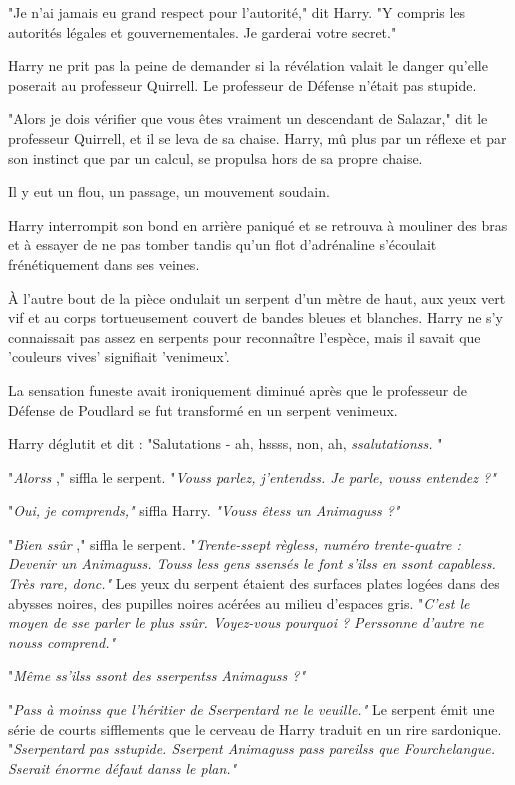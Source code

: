 "Je n'ai jamais eu grand respect pour l'autorité," dit Harry. "Y compris les autorités légales et gouvernementales. Je garderai votre secret."

Harry ne prit pas la peine de demander si la révélation valait le danger qu'elle poserait au professeur Quirrell. Le professeur de Défense n'était pas stupide.

"Alors je dois vérifier que vous êtes vraiment un descendant de Salazar," dit le professeur Quirrell, et il se leva de sa chaise. Harry, mû plus par un réflexe et par son instinct que par un calcul, se propulsa hors de sa propre chaise.

Il y eut un flou, un passage, un mouvement soudain.

Harry interrompit son bond en arrière paniqué et se retrouva à mouliner des bras et à essayer de ne pas tomber tandis qu'un flot d'adrénaline s'écoulait frénétiquement dans ses veines.

À l'autre bout de la pièce ondulait un serpent d'un mètre de haut, aux yeux vert vif et au corps tortueusement couvert de bandes bleues et blanches. Harry ne s'y connaissait pas assez en serpents pour reconnaître l'espèce, mais il savait que 'couleurs vives' signifiait 'venimeux'.

La sensation funeste avait ironiquement diminué après que le professeur de Défense de Poudlard se fut transformé en un serpent venimeux.

Harry déglutit et dit : "Salutations - ah, hssss, non, ah, \emph{ssalutationss.} "

"\emph{Alorss} ," siffla le serpent. "\emph{Vouss parlez, j'entendss. Je parle, vouss entendez ?"} 

"\emph{Oui, je comprends," } siffla Harry.\emph{ "Vouss êtess un Animaguss ?"} 

"\emph{Bien ssûr} ," siffla le serpent. "\emph{Trente-ssept règless, numéro trente-quatre : Devenir un Animaguss. Touss less gens ssensés le font s'ilss en ssont capabless. Très rare, donc."}  Les yeux du serpent étaient des surfaces plates logées dans des abysses noires, des pupilles noires acérées au milieu d'espaces gris. "\emph{C'est le moyen de sse parler le plus ssûr. Voyez-vous pourquoi ? Perssonne d'autre ne nouss comprend."} 

"\emph{Même ss'ilss ssont des sserpentss Animaguss ?"} 

"\emph{Pass à moinss que l'héritier de Sserpentard ne le veuille."}  Le serpent émit une série de courts sifflements que le cerveau de Harry traduit en un rire sardonique. "\emph{Sserpentard pas sstupide. Sserpent Animaguss pass pareilss que Fourchelangue. Sserait énorme défaut danss le plan."} 

